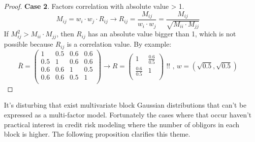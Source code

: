 \documentclass[11pt,fleqn]{book} %
\begin{document}
\begin{proof}
	\textbf{Case 2}. Factors correlation with absolute value > 1.
	\begin{displaymath}
		M_{ij} = w_i \cdot w_j \cdot R_{ij} \longrightarrow 
		R_{ij} = \frac{M_{ij}}{w_i \cdot w_j} = 
		\frac{M_{ij}}{\sqrt{M_{ii} \cdot M_{jj}}}
	\end{displaymath}
	If $M_{ij}^2 > M_{ii} \cdot M_{jj}$, then $R_{ij}$ has an absolute value
	bigger than 1, which is not possible because $R_{ij}$ is a correlation
	value. By example:
	\begin{displaymath}
		\bar{R} = \left(
		\begin{array}{cc|cc}
			1   & 0.5 & 0.6 & 0.6 \\
			0.5 & 1   & 0.6 & 0.6 \\
			\hline
			0.6 & 0.6 & 1   & 0.5 \\
			0.6 & 0.6 & 0.5 & 1   \\
		\end{array}
		\right) 
		\longrightarrow
		R = \left(
		\begin{array}{cc}
			1               & \frac{0.6}{0.5} \\
			\frac{0.6}{0.5} & 1               \\
		\end{array}
		\right)
		\text{ !!}
		\text{ , }
		w = (\sqrt{0.5}, \sqrt{0.5})
	\end{displaymath}
\end{proof}

It's disturbing that exist multivariate block Gaussian distributions 
that can't be expressed as a multi-factor model. Fortunately the 
cases where that occur haven't practical interest in credit risk
modeling where the number of obligors in each block is higher. 
The following proposition clarifies this theme.
\end{document}
